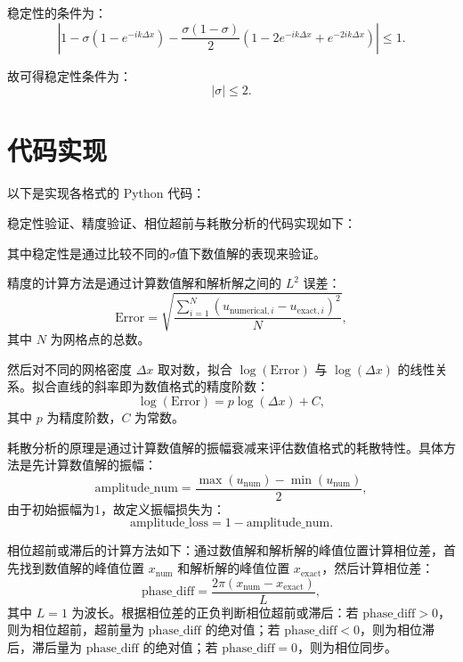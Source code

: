 \documentclass[12pt,a4paper]{article}
\begin{document}
稳定性的条件为：
\[
|1-\sigma (1 - e^{-ik\Delta x}) - \frac{\sigma (1-\sigma)}{2} (1 - 2e^{-ik\Delta x} + e^{-2ik\Delta x})| \leq 1.
\]

故可得稳定性条件为：
\[
|\sigma| \leq 2.
\]

\newpage
\section{代码实现}
以下是实现各格式的 Python 代码：


稳定性验证、精度验证、相位超前与耗散分析的代码实现如下：


其中稳定性是通过比较不同的$\sigma$值下数值解的表现来验证。

精度的计算方法是通过计算数值解和解析解之间的 $L^2$ 误差：
\[
\text{Error} = \sqrt{\frac{\sum_{i=1}^N \left( u_{\text{numerical}, i} - u_{\text{exact}, i} \right)^2}{N}},
\]
其中 $N$ 为网格点的总数。

然后对不同的网格密度 $\Delta x$ 取对数，拟合 $\log(\text{Error})$ 与 $\log(\Delta x)$ 的线性关系。拟合直线的斜率即为数值格式的精度阶数：
\[
\log(\text{Error}) = p \log(\Delta x) + C,
\]
其中 $p$ 为精度阶数，$C$ 为常数。

耗散分析的原理是通过计算数值解的振幅衰减来评估数值格式的耗散特性。具体方法是先计算数值解的振幅：
\[
\text{amplitude\_num} = \frac{\max(u_{\text{num}}) - \min(u_{\text{num}})}{2},
\]
由于初始振幅为1，故定义振幅损失为：
\[
\text{amplitude\_loss} = 1 - \text{amplitude\_num}.
\]

相位超前或滞后的计算方法如下：通过数值解和解析解的峰值位置计算相位差，首先找到数值解的峰值位置 $x_{\text{num}}$ 和解析解的峰值位置 $x_{\text{exact}}$，然后计算相位差：
\[
\text{phase\_diff} = \frac{2\pi (x_{\text{num}} - x_{\text{exact}})}{L},
\]
其中 $L = 1$ 为波长。根据相位差的正负判断相位超前或滞后：若 $\text{phase\_diff} > 0$，则为相位超前，超前量为 $\text{phase\_diff}$ 的绝对值；若 $\text{phase\_diff} < 0$，则为相位滞后，滞后量为 $\text{phase\_diff}$ 的绝对值；若 $\text{phase\_diff} = 0$，则为相位同步。
\end{document}
